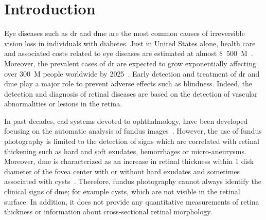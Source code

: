 \graphicspath{ {./content/intro/figures/} }

\section{Introduction}

Eye diseases such as \ac{dr} and \ac{dme} are the most common causes of irreversible vision loss in individuals with diabetes.
Just in United States alone, health care and associated costs related to eye diseases are estimated at almost \SI{500}[\$]{M}~\cite{Sharma2005}.
Moreover, the prevalent cases of \ac{dr} are expected to grow exponentially affecting over \SI{300}{M} people worldwide by 2025~\cite{Wild2004}.
Early detection and treatment of \ac{dr} and \ac{dme} play a major role to prevent adverse effects such as blindness.
Indeed, the detection and diagnosis of retinal diseases are based on the detection of vascular abnormalities or lesions in the retina. 

In past decades, \ac{cad} systems devoted to ophthalmology, have been developed focusing on the automatic analysis of fundus images~\cite{Abramoff2010,Trucco2013}.
However, the use of fundus photography is limited to the detection of signs which are correlated with retinal thickening such as hard and soft exudates, hemorrhages or micro-aneurysms.
Moreover, \ac{dme} is characterized as an increase in retinal thickness within 1 disk diameter of the fovea center with or without hard exudates and sometimes associated with cysts~\cite{ETDRSG1985}.
Therefore, fundus photography cannot always identify the clinical signs of \ac{dme}; for example cysts, which are not visible in the retinal surface. In addition, it does not provide any quantitative measurements of retina thickness or information about cross-sectional retinal morphology. 

